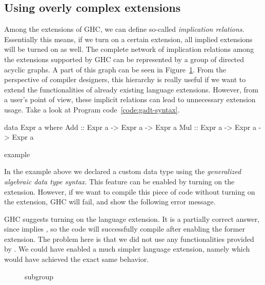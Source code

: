 \documentclass[main.tex]{subfiles}
\begin{document}
	\subsection{Using overly complex extensions}
	
	Among the extensions of GHC, we can define so-called \emph{implication relations}. Essentially this means, if we turn on a certain extension, all implied extensions will be turned on as well. The complete network of implication relations among the extensions supported by GHC can be represented by a group of directed acyclic graphs. A part of this graph can be seen in Figure~\ref{fig:explicit-namespaces-dag}. From the perspective of compiler designers, this hierarchy is really useful if we want to extend the functionalities of already existing language extensions. However, from a user's point of view, these implicit relations can lead to unnecessary extension usage. Take a look at Program code~\ref{code:gadt-syntax}.
	
	\begin{codeFloat}[H]
		\begin{haskell}
    data Expr a where
      Add :: Expr a -> Expr a -> Expr a
      Mul :: Expr a -> Expr a -> Expr a
		\end{haskell}
		\caption{ example}
		\label{code:gadt-syntax}
	\end{codeFloat}
	
	\noindent
	In the example above we declared a custom data type using the \emph{generalized algebraic data type syntax}. This feature can be enabled by turning on the  extension. However, if we want to compile this piece of code without turning on the extension, GHC will fail, and show the following error message.
	
	\begin{oneLineHaskell}
	\end{oneLineHaskell}
	
	\noindent
	GHC suggests turning on the  language extension. It is a partially correct answer, since  implies , so the code will successfully compile after enabling the former extension. The problem here is that we did not use any functionalities provided by . We could have enabled a much simpler language extension, namely  which would have achieved the exact same behavior.
	
	\begin{figure}
		\scalebox{0.88}{}
		\caption{ subgroup}
		\label{fig:explicit-namespaces-dag}
	\end{figure}
	
\end{document}
